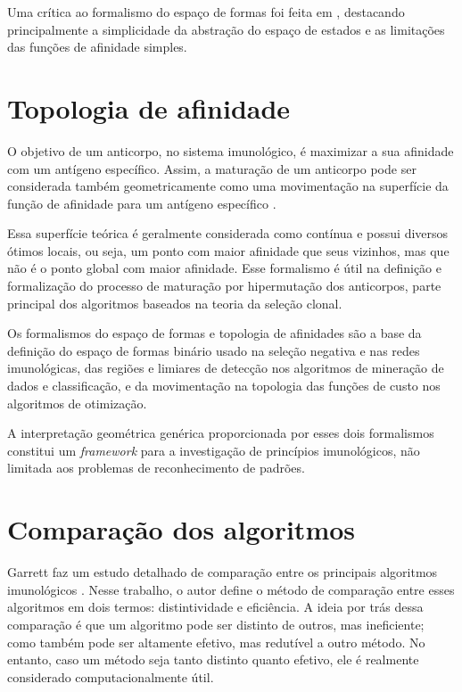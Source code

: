 Uma crítica ao formalismo do espaço de formas foi feita em \citet{Carneiro1994}, destacando principalmente a simplicidade da abstração do espaço de estados e as limitações das funções de afinidade simples.

\section{Topologia de afinidade}

O objetivo de um anticorpo, no sistema imunológico, é maximizar a sua afinidade com um antígeno específico. Assim, a maturação de um anticorpo pode ser considerada também geometricamente como uma movimentação na superfície da função de afinidade para um antígeno específico \cite{Brownlee2007}.

Essa superfície teórica é geralmente considerada como contínua e possui diversos ótimos locais, ou seja, um ponto com maior afinidade que seus vizinhos, mas que não é o ponto global com maior afinidade. Esse formalismo é útil na definição e formalização do processo de maturação por hipermutação dos anticorpos, parte principal dos algoritmos baseados na teoria da seleção clonal.

Os formalismos do espaço de formas e topologia de afinidades são a base da definição do espaço de formas binário usado na seleção negativa e nas redes imunológicas, das regiões e limiares de detecção nos algoritmos de mineração de dados e classificação, e da movimentação na topologia das funções de custo nos algoritmos de otimização.

A interpretação geométrica genérica proporcionada por esses dois formalismos constitui um \emph{framework} para a investigação de princípios imunológicos, não limitada aos problemas de reconhecimento de padrões.

\section{Comparação dos algoritmos}

Garrett faz um estudo detalhado de comparação entre os principais algoritmos imunológicos \cite{Garrett2005}. Nesse trabalho, o autor define o método de comparação entre esses algoritmos em dois termos: distintividade e eficiência. A ideia por trás dessa comparação é que um algoritmo pode ser distinto de outros, mas ineficiente; como também pode ser altamente efetivo, mas redutível a outro método. No entanto, caso um método seja tanto distinto quanto efetivo, ele é realmente considerado computacionalmente útil.

